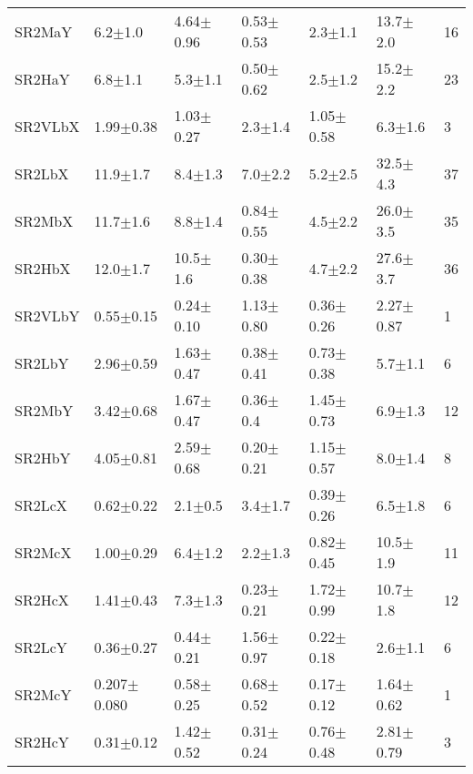 \begin{table}
\begin{center}
\begin{tabular}{l l l l l l || l }
SR2MaY    &  6.2$\pm$1.0    &    4.64$\pm$0.96 &     0.53$\pm$0.53  &    2.3$\pm$1.1    &    13.7$\pm$2.0   &   16 \\ 
SR2HaY    &  6.8$\pm$1.1    &    5.3$\pm$1.1  &     0.50$\pm$0.62  &    2.5$\pm$1.2    &    15.2$\pm$2.2   &   23 \\ 
SR2VLbX   &  1.99$\pm$0.38   &    1.03$\pm$0.27 &     2.3$\pm$1.4   &    1.05$\pm$0.58   &    6.3$\pm$1.6    &   3 \\ 
SR2LbX    &  11.9$\pm$1.7    &    8.4$\pm$1.3  &     7.0$\pm$2.2   &    5.2$\pm$2.5    &    32.5$\pm$4.3   &   37 \\ 
SR2MbX    &  11.7$\pm$1.6    &    8.8$\pm$1.4  &     0.84$\pm$0.55  &    4.5$\pm$2.2    &    26.0$\pm$3.5   &   35 \\ 
SR2HbX    &  12.0$\pm$1.7    &    10.5$\pm$1.6  &     0.30$\pm$0.38  &    4.7$\pm$2.2    &    27.6$\pm$3.7   &   36 \\ 
SR2VLbY   &  0.55$\pm$0.15   &    0.24$\pm$0.10 &     1.13$\pm$0.80  &    0.36$\pm$0.26   &    2.27$\pm$0.87  &   1 \\ 
SR2LbY    &  2.96$\pm$0.59   &    1.63$\pm$0.47 &     0.38$\pm$0.41  &    0.73$\pm$0.38   &    5.7$\pm$1.1    &   6 \\ 
SR2MbY    &  3.42$\pm$0.68   &    1.67$\pm$0.47 &     0.36$\pm$0.4   &    1.45$\pm$0.73   &    6.9$\pm$1.3    &   12 \\ 
SR2HbY    &  4.05$\pm$0.81   &    2.59$\pm$0.68 &     0.20$\pm$0.21  &    1.15$\pm$0.57   &    8.0$\pm$1.4    &   8 \\ 
SR2LcX    &  0.62$\pm$0.22   &    2.1$\pm$0.5  &     3.4$\pm$1.7   &    0.39$\pm$0.26   &    6.5$\pm$1.8    &   6 \\ 
SR2McX    &  1.00$\pm$0.29   &    6.4$\pm$1.2  &     2.2$\pm$1.3   &    0.82$\pm$0.45   &    10.5$\pm$1.9   &   11 \\ 
SR2HcX    &  1.41$\pm$0.43   &    7.3$\pm$1.3  &     0.23$\pm$0.21  &    1.72$\pm$0.99   &    10.7$\pm$1.8   &   12 \\ 
SR2LcY    &  0.36$\pm$0.27   &    0.44$\pm$0.21 &     1.56$\pm$0.97  &    0.22$\pm$0.18   &    2.6$\pm$1.1    &   6 \\ 
SR2McY    &  0.207$\pm$0.080  &    0.58$\pm$0.25 &     0.68$\pm$0.52  &    0.17$\pm$0.12   &    1.64$\pm$0.62  &   1 \\ 
SR2HcY    &  0.31$\pm$0.12   &    1.42$\pm$0.52 &     0.31$\pm$0.24  &    0.76$\pm$0.48   &    2.81$\pm$0.79  &   3 \\ 




\end{tabular}
\end{center}
\end{table}


